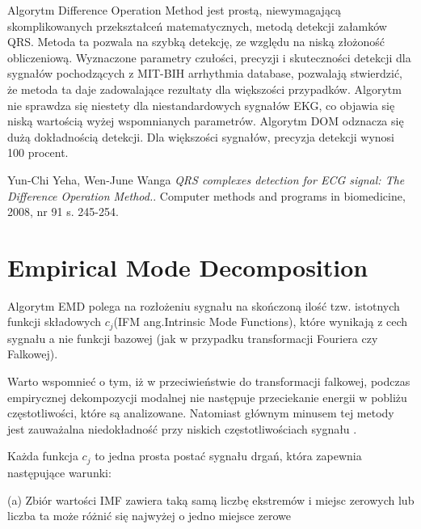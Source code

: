 \documentclass[10pt,a4paper]{article}
\begin{document}
Algorytm Difference Operation Method jest prostą, niewymagającą skomplikowanych przekształceń matematycznych, metodą detekcji załamków QRS. Metoda ta pozwala na szybką detekcję, ze względu na niską złożoność obliczeniową. Wyznaczone parametry czułości, precyzji i skuteczności detekcji dla sygnałów pochodzących z MIT-BIH arrhythmia database, pozwalają stwierdzić, że metoda ta daje zadowalające rezultaty dla większości przypadków. Algorytm nie sprawdza się niestety dla niestandardowych sygnałów EKG, co objawia się niską wartością wyżej wspomnianych parametrów. Algorytm DOM odznacza się dużą dokładnością detekcji. Dla większości sygnałów, precyzja detekcji wynosi 100 procent.

\newpage

\begin{thebibliography}{9}
 
Yun-Chi Yeha, Wen-June Wanga 
\textit{QRS complexes detection for ECG signal: The Difference Operation Method.}. 
Computer methods and programs in biomedicine, 2008, nr 91 s. 245-254.

\end{thebibliography}

\newpage

\section{Empirical Mode Decomposition}
	Algorytm EMD polega na rozłożeniu sygnału na skończoną ilość tzw. istotnych funkcji składowych $c_j$(IFM ang.Intrinsic Mode Functions), które wynikają z cech sygnału a nie funkcji bazowej (jak w przypadku transformacji Fouriera czy Falkowej).

Warto wspomnieć o tym, iż w przeciwieństwie do transformacji falkowej, podczas
empirycznej dekompozycji modalnej nie następuje przeciekanie energii w pobliżu
częstotliwości, które są analizowane. Natomiast głównym minusem tej metody jest
zauważalna niedokładność przy niskich częstotliwościach sygnału \cite{dwa}.

 \vspace{1em} 

Każda funkcja $c_j$ to jedna prosta postać sygnału drgań, która zapewnia następujące warunki:

\vspace{2em}

(a) Zbiór wartości IMF zawiera taką samą liczbę ekstremów i miejsc zerowych lub liczba ta
może różnić się najwyżej o jedno miejsce zerowe
\end{document}
